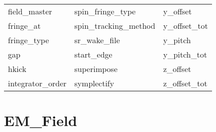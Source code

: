 \begin{tabular}{lll}
field_master                & spin_fringe_type            & y_offset                    \\
fringe_at                   & spin_tracking_method        & y_offset_tot                \\
fringe_type                 & sr_wake_file                & y_pitch                     \\
gap                         & start_edge                  & y_pitch_tot                 \\
hkick                       & superimpose                 & z_offset                    \\
integrator_order            & symplectify                 & z_offset_tot                \\
 \bottomrule
 \end{tabular}
 \vfill
 
 \section{EM_Field}
 \label{s:list.em.field}
 
